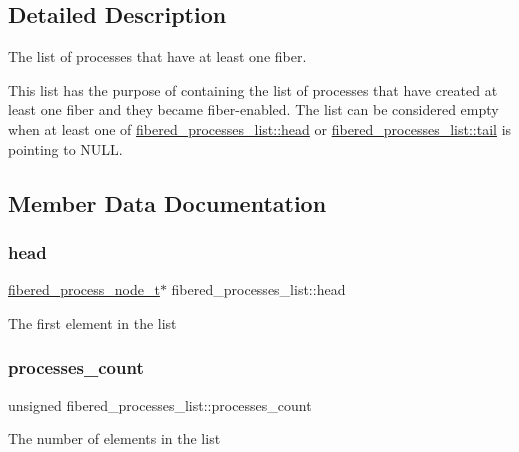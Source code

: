 \subsection{Detailed Description}
The list of processes that have at least one fiber. 

This list has the purpose of containing the list of processes that have created at least one fiber and they became fiber-\/enabled. The list can be considered empty when at least one of \mbox{\hyperlink{structfibered__processes__list_a460c3f34099c7589c25c383add98650b}{fibered\+\_\+processes\+\_\+list\+::head}} or \mbox{\hyperlink{structfibered__processes__list_a423b95d461fa440ede7dd019b8c94aa6}{fibered\+\_\+processes\+\_\+list\+::tail}} is pointing to {\ttfamily N\+U\+LL}. 

\subsection{Member Data Documentation}
\mbox{\label{structfibered__processes__list_a460c3f34099c7589c25c383add98650b}} 
\subsubsection{\texorpdfstring{head}{head}}
{\footnotesize\ttfamily \mbox{\hyperlink{core_8h_aa16708c717e33e5e95614cd1e4ca7b2b}{fibered\+\_\+process\+\_\+node\+\_\+t}}$\ast$ fibered\+\_\+processes\+\_\+list\+::head}

The first element in the list \mbox{\label{structfibered__processes__list_a357ed70a414391e2cde4cf1c6062b6ce}} 
\subsubsection{\texorpdfstring{processes\+\_\+count}{processes\_count}}
{\footnotesize\ttfamily unsigned fibered\+\_\+processes\+\_\+list\+::processes\+\_\+count}

The number of elements in the list \mbox{\label{structfibered__processes__list_a423b95d461fa440ede7dd019b8c94aa6}} 
